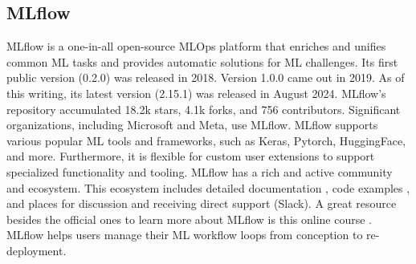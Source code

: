 \subsection{MLflow}\label{subsection:mlflow}

MLflow \cite{mlflow:homepage} is a one-in-all open-source MLOps platform that enriches and unifies common ML tasks and provides automatic solutions for ML challenges.
Its first public version (0.2.0) was released in 2018.
Version 1.0.0 came out in 2019.
As of this writing, its latest version (2.15.1) was released in August 2024.
MLflow's repository \cite{mlflow:github} accumulated 18.2k stars, 4.1k forks, and 756 contributors.
Significant organizations, including Microsoft and Meta, use MLflow.
MLflow supports various popular ML tools and frameworks, such as Keras, Pytorch, HuggingFace, and more.
Furthermore, it is flexible for custom user extensions to support specialized functionality and tooling.
MLflow has a rich and active community and ecosystem.
This ecosystem includes detailed documentation \cite{mlflow:docs}, code examples \cite{mlflow:examples}, and places for discussion and receiving direct support (Slack).
A great resource besides the official ones to learn more about MLflow is this online course \cite{mlflow:udemy}.
MLflow helps users manage their ML workflow loops from conception to re-deployment.


